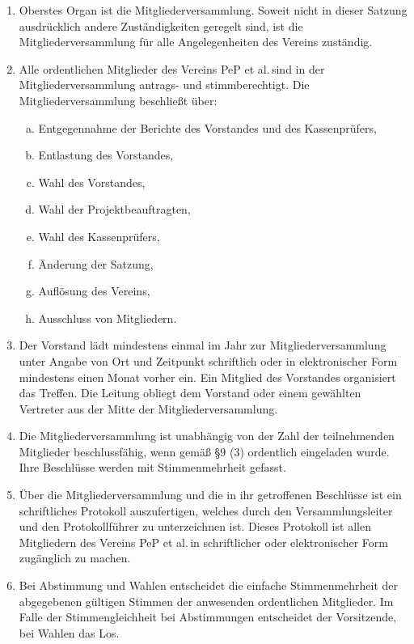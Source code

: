 \documentclass[fontsize=12pt, paper=a4, DIV14, parskip]{scrreprt}
\begin{document}
\begin{enumerate}[\qquad(1)]
	\item Oberstes Organ ist die Mitgliederversammlung. Soweit nicht in dieser Satzung ausdrücklich andere Zuständigkeiten geregelt sind, ist die Mitgliederversammlung für alle Angelegenheiten des Vereins zuständig.
	\item Alle ordentlichen Mitglieder des Vereins \glqq PeP et al.\grqq$\,$sind in der Mitgliederversammlung antrags- und stimmberechtigt. Die Mitgliederversammlung beschließt über:
	\begin{enumerate}[(a)]\itemsep-12pt
		\item Entgegennahme der Berichte des Vorstandes und des Kassenprüfers,
		\item Entlastung des Vorstandes,
		\item Wahl des Vorstandes,
		\item Wahl der Projektbeauftragten,
		\item Wahl des Kassenprüfers,
		\item Änderung der Satzung,
		\item Auflösung des Vereins,
		\item Ausschluss von Mitgliedern.
	\end{enumerate}
	\item Der Vorstand lädt mindestens einmal im Jahr zur Mitgliederversammlung unter Angabe von Ort und Zeitpunkt schriftlich oder in elektronischer Form mindestens einen Monat vorher ein. Ein Mitglied des Vorstandes organisiert das Treffen. Die Leitung obliegt dem Vorstand oder einem gewählten Vertreter aus der Mitte der Mitgliederversammlung.
	\item Die Mitgliederversammlung ist unabhängig von der Zahl der teilnehmenden Mitglieder beschlussfähig, wenn gemäß §9 (3) ordentlich eingeladen wurde. Ihre Beschlüsse werden mit Stimmenmehrheit gefasst.
	\item Über die Mitgliederversammlung und die in ihr getroffenen Beschlüsse ist ein schriftliches Protokoll auszufertigen, welches durch den Versammlungsleiter und den Protokollführer zu unterzeichnen ist. Dieses Protokoll ist allen Mitgliedern des Vereins \glqq PeP et al.\grqq$\,$in schriftlicher oder elektronischer Form zugänglich zu machen.
	\item Bei Abstimmung und Wahlen entscheidet die einfache Stimmenmehrheit der abgegebenen gültigen Stimmen der anwesenden ordentlichen Mitglieder. Im Falle der Stimmengleichheit bei Abstimmungen entscheidet der Vorsitzende, bei Wahlen das Los.

\end{enumerate}
\end{document}
